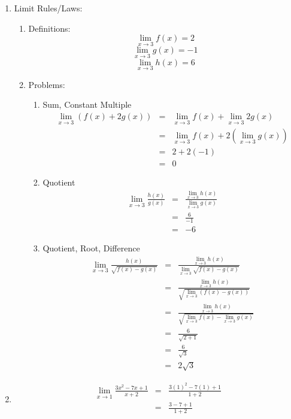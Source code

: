 \documentclass{article}
\begin{document}
\begin{enumerate}
    \item Limit Rules/Laws:
    \begin{enumerate}
        \item Definitions:
    		$$\lim\limits_{x \to 3}{f(x)} = 2$$
    		$$\lim\limits_{x \to 3}{g(x)} = -1$$
    		$$\lim\limits_{x \to 3}{h(x)} = 6$$
        \item Problems:
        \begin{enumerate}
    		\item Sum, Constant Multiple
    			\begin{eqnarray}
    			\lim_{x \to 3}{(f(x) + 2g(x))} &=& \lim_{x \to 3}{f(x)} + \lim_{x \to 3}{2g(x)} \\
    			&=& \lim_{x \to 3}{f(x)} + 2(\lim_{x \to 3}{g(x)}) \\
    			&=& 2 + 2(-1) \\
    			&=& 0
    			\end{eqnarray}
    		\item Quotient
    			\begin{eqnarray}
    			\lim_{x \to 3}{\frac{h(x)}{g(x)}} &=& \frac{\lim\limits_{x \to 3}{h(x)}}{\lim\limits_{x \to 3}{g(x)}} \\
    			&=& \frac{6}{-1} \\
    			&=& -6
    			\end{eqnarray}
    		\item Quotient, Root, Difference
    			\begin{eqnarray}
    			\lim_{x \to 3}{\frac{h(x)}{\sqrt{f(x) - g(x)}}} &=& \frac{\lim\limits_{x \to 3}{h(x)}}{\lim\limits_{x \to 3}{\sqrt{f(x) - g(x)}}}\\
    			&=& \frac{\lim\limits_{x \to 3}{h(x)}}{\sqrt{\lim\limits_{x \to 3}{(f(x) - g(x))}}} \\
    			&=& \frac{\lim\limits_{x \to 3}{h(x)}}{\sqrt{\lim\limits_{x \to 3}f(x) - \lim\limits_{x \to 3}g(x)}} \\
    			&=& \frac{6}{\sqrt{2 + 1}} \\
    			&=& \frac{6}{\sqrt{3}} \\
    			&=& 2 \sqrt{3}
    			\end{eqnarray}
        \end{enumerate}
    \end{enumerate}
    \item
    	\begin{eqnarray}
    	    \lim_{x \to 1}{\frac{3x^2 - 7x + 1}{x + 2}} &=& \frac{3(1)^2 - 7(1) + 1}{1 + 2} \\
    	    &=& \frac{3 - 7 + 1}{1+2} \\

\end{eqnarray}
\end{enumerate}
\end{document}
